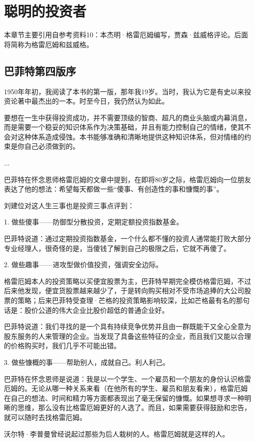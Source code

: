 \documentclass[12pt,oneside]{book}
\begin{document}
\chapter{聪明的投资者}
本章节主要引用自参考资料10：本杰明·格雷厄姆编写，贾森·兹威格评论。后面将简称为格雷厄姆和兹威格。

\section{巴菲特第四版序}
1950年年初，我阅读了本书的第一版，那年我19岁。当时，我认为它是有史以来投资论著中最杰出的一本。时至今日，我仍然认为如此。

要想在一生中获得投资成功，并不需要顶级的智商、超凡的商业头脑或内幕消息，而是需要一个稳妥的知识体系作为决策基础，并且有能力控制自己的情绪，使其不会对这种体系造成侵蚀。本书能够准确和清晰地提供这种知识体系，但对情绪的约束是你自己必须做到的。

...

巴菲特在怀念恩师格雷厄姆的文章中提到，在即将80岁之际，格雷厄姆向一位朋友表达了他的想法：希望每天都做一些“傻事、有创造性的事和慷慨的事”。

刘建位对这人生三事也是投资三事点评到：

1. 做些傻事——防御型分散投资，定期定额投资指数基金。

巴菲特说道：通过定期投资指数基金，一个什么都不懂的投资人通常能打败大部分专业经理人，很奇怪的是，当傻钱了解到自己的极限之后，它就不再傻了。

2. 做些趣事——进攻型做价值投资，强调安全边际。

格雷厄姆本人的投资策略以买便宜股票为主，巴菲特早期完全模仿格雷厄姆，不过后来他发现，便宜货股票越来越少了，于是转向购买相对不受市场追捧的大公司股票的策略；后来巴菲特受查理·芒格的投资策略影响较深，比如芒格最有名的那句话是：股价公道的伟大企业比股价超低的普通企业好。

巴菲特说道：我们寻找的是一个具有持续竞争优势并且由一群既能干又全心全意为股东服务的人来管理的企业。当发现了具备这些特征的企业，而且我们又能以合理的价格购买时，我们几乎不可能出错。


3. 做些慷概的事——帮助别人，成就自己。利人利己。

巴菲特在怀念恩师是说道：我是以一个学生、一个雇员和一个朋友的身份认识格雷厄姆的。无论从哪一种关系来看（在他所有的学生、雇员和朋友看来），格雷厄姆在自己的想法、时间和精力等方面都表现出了毫无保留的慷慨。如果想寻求一种明晰的思维，那么没有比格雷厄姆更好的人选了。而且，如果需要获得鼓励和忠告，就可以随时去找格雷厄姆。

沃尔特·李普曼曾经说起过那些为后人栽树的人。格雷厄姆就是这样的人。
\end{document}
